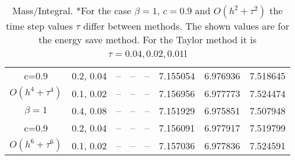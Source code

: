 \documentclass{article}
\begin{document}
\begin{table}[ht]
\begin{tabular}{||c|l|l|l|l|l|l|l||}
       c=0.9                      & 0.2, 0.04    & --  & --  & -- &  7.155054       & 6.976936  & 7.518645  \\
       $O(h^4+ \tau^4)$ & 0.1, 0.02   & --  & --  & -- &  7.156956       & 6.977773  & 7.524474   \\
    \hline
  $\beta=1$                   & 0.4, 0.08        & --  & --  & -- &  7.151929       & 6.975851  & 7.507948  \\
      c=0.9                       & 0.2, 0.04        & --  & --  & -- & 7.156091       & 6.977917  & 7.519799   \\
     $O(h^6+ \tau^6)$   & 0.1, 0.02        & --  & --  & --   & 7.157036       & 6.977836  & 7.524591  \\
	   		\hline
			\hline 
		\end{tabular}
		\caption{ Mass/Integral. *For the case  $\beta=1$, $c=0.9$ and $O(h^2+ \tau^2)$ the time step values $\tau$ differ between methods. The shown values are for the energy save method. For the Taylor method it is $\tau = 0.04, 0.02, 0.01 $l}
\label{tableB}
\end{table}
\end{document}
